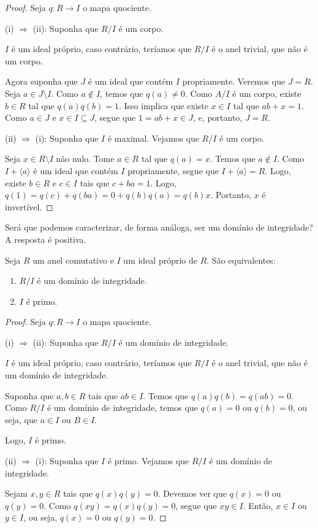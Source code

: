 \begin{proof}
    Seja $q:R\rightarrow I$ o mapa quociente.

    (i) $\Rightarrow$ (ii): Suponha que $R/I$ é um corpo.
    

    $I$ é um ideal próprio, caso contrário, teríamos que $R/I$ é o anel trivial, que não é um corpo.

    Agora suponha que $J$ é um ideal que contém $I$ propriamente.
    Veremos que $J=R$.
    Seja $a \in J\setminus I$.
    Como $a\notin I$, temos que $q(a)\neq 0$.
    Como $A/I$ é um corpo, existe $b \in R$ tal que $q(a)q(b)=1$.
    Isso implica que existe $x \in I$ tal que $ab+x=1$.
    Como $a \in J$ e $x \in I\subseteq J$, segue que $1=ab+x\in J$, e, portanto, $J=R$.

    (ii) $\Rightarrow$ (i): Suponha que $I$ é maximal. Vejamos que $R/I$ é um corpo.

    Seja $x \in R\setminus I$ não nulo.
    Tome $a \in R$ tal que $q(a)=x$.
    Temos que $a \notin I$.
    Como $I+\langle a\rangle$ é um ideal que contém $I$ propriamente, segue que $I+\langle a\rangle=R$.
    Logo, existe $b \in R$ e $c \in I$ tais que $c+ba=1$.
    Logo, $q(1)=q(c)+q(ba)=0+q(b)q(a)=q(b)x$.
    Portanto, $x$ é invertível.
\end{proof}

Será que podemos caracterizar, de forma análoga, ser um domínio de integridade? A resposta é positiva.

\begin{prop}
    Seja $R$ um anel comutativo e $I$ um ideal próprio de $R$. São equivalentes:
    
    \begin{enumerate}[label=(\roman*)]
        \item $R/I$ é um domínio de integridade.
        \item $I$ é primo.
    \end{enumerate}
\end{prop}

\begin{proof}
    Seja $q:R\rightarrow I$ o mapa quociente.

    (i) $\Rightarrow$ (ii): Suponha que $R/I$ é um domínio de integridade.
    

    $I$ é um ideal próprio, caso contrário, teríamos que $R/I$ é o anel trivial, que não é um domínio de integridade.

    Suponha que $a,b \in R$ tais que $ab \in I$.
    Temos que $q(a)q(b)=q(ab)=0$.
    Como $R/I$ é um domínio de integridade, temos que $q(a)=0$ ou $q(b)=0$, ou seja, que $a \in I$ ou $B \in I$.

    Logo, $I$ é primo.

    (ii) $\Rightarrow$ (i): Suponha que $I$ é primo.
    Vejamos que $R/I$ é um domínio de integridade.

    Sejam $x, y \in R$ tais que $q(x)q(y)=0$.
    Devemos ver que $q(x)=0$ ou $q(y)=0$.
    Como $q(xy)=q(x)q(y)=0$, segue que $xy\in I$.
    Então, $x\in I$ ou $y\in I$, ou seja, $q(x)=0$ ou $q(y)=0$.
\end{proof}

